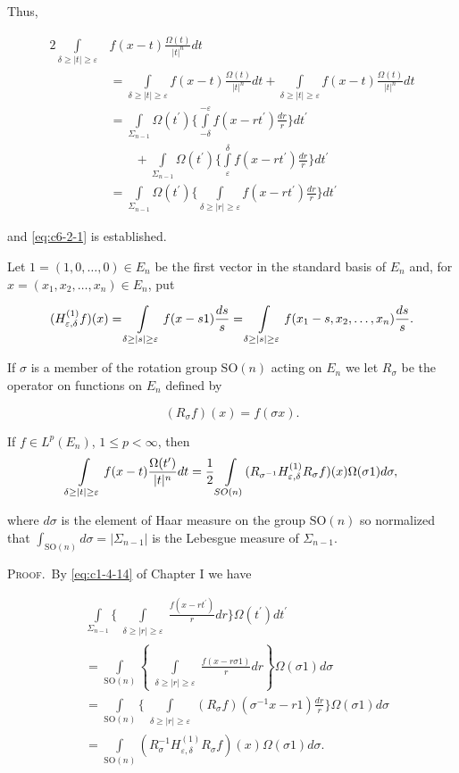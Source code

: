 Thus,

\[
\begin{aligned}2\int\limits_{\delta\geq|t|\geq\varepsilon}&f(x-t)\frac{\Omega(t)}{|t|^{n}}dt\\&=\int\limits_{\delta\geq|t|\geq\varepsilon}f(x-t)\frac{\Omega(t)}{|t|^{n}}dt+\int\limits_{\delta\geq|t|\geq\varepsilon}f(x-t)\frac{\Omega(t)}{|t|^{n}}dt\\&=\int\limits_{\Sigma_{n-1}}\Omega(t^{\prime})\Biggl\{\int\limits_{-\delta}^{-\varepsilon}f(x-rt^{\prime})\frac{dr}{r}\Biggr\}dt^{\prime}\\&\qquad+\int\limits_{\Sigma_{n-1}}\Omega(t^{\prime})\Biggl\{\int\limits_{\varepsilon}^{\delta}f(x-rt^{\prime})\frac{dr}{r}\Biggr\}dt^{\prime}\\&=\int\limits_{\Sigma_{n-1}}\Omega(t^{\prime})\Biggl\{\int\limits_{\delta\geq|r|\geq\varepsilon}f(x-rt^{\prime})\frac{dr}{r}\Biggr\}dt^{\prime}\end{aligned}
\]

and \eqref{eq:c6-2-1} is established.

Let $1 = (1, 0, \ldots, 0) \in E_n$ be the first vector in the standard basis of $E_n$ and, for $x = (x_1, x_2, \ldots, x_n) \in E_n$, put

\[
(H_{\varepsilon,\delta}^{(1)}f)(x)=\intop_{\delta\ge|s|\ge\varepsilon}f(x-s1)\frac{d s}{s}=\intop_{\delta\ge|s|\ge\varepsilon}f(x_{1}-s,x_{2},\ldots,x_{n})\frac{d s}{s}.
\]

If $\sigma$ is a member of the rotation group $\mathrm{SO}(n)$ acting on $E_n$ we let $R_\sigma$ be the operator on functions on $E_n$ defined by

\[
(R_{\sigma}f)(x)=f(\sigma x).
\]

\begin{lemma}
\label{lem:c6-2-2}
If $f \in L^{p}(E_{n})$, $1 \leq p < \infty$, then
\[
\intop_{\substack{\delta\geq|t|\geq\varepsilon}}f(x-t)\frac{\Omega(t^{\prime})}{|t|^{n}}d t=\frac{1}{2}\intop_{S O(n)}(R_{\sigma^{-1}}H_{\varepsilon,\delta}^{(1)}R_{\sigma}f)(x)\Omega(\sigma1)d\sigma,
\]

where $d\sigma$ is the element of Haar measure on the group $\mathrm{SO}(n)$ so normalized that $\int_{\mathrm{SO}(n)} d\sigma = |\Sigma_{n-1}|$ is the Lebesgue measure of $\Sigma_{n-1}$.
\end{lemma}

\textsc{Proof.}\ By \eqref{eq:c1-4-14} of Chapter I we have

\[
\begin{aligned}&\int\limits_{\Sigma_{n-1}}\Bigg\{\int\limits_{\substack{\delta\geq|r|\geq\varepsilon}}\frac{f(x-rt^{\prime})}{r}dr\Bigg\}\Omega(t^{\prime})dt^{\prime}\\&=\int\limits_{\mathrm{SO}(n)}\left\{\int\limits_{\substack{\delta\geq|r|\geq\varepsilon}}\frac{f(x-r\sigma1)}{r}dr\right\}\Omega(\sigma1)d\sigma\\&=\int\limits_{\mathrm{SO}(n)}\Bigg\{\int\limits_{\substack{\delta\geq|r|\geq\varepsilon}}(R_\sigma f)(\sigma^{-1}x-r1)\frac{dr}{r}\Bigg\}\Omega(\sigma1)d\sigma\\&=\int\limits_{\mathrm{SO}(n)}(R_\sigma^{-1}H^{(1)}_{\varepsilon,\delta}R_\sigma f)(x)\Omega(\sigma1)d\sigma.\end{aligned}
\]

